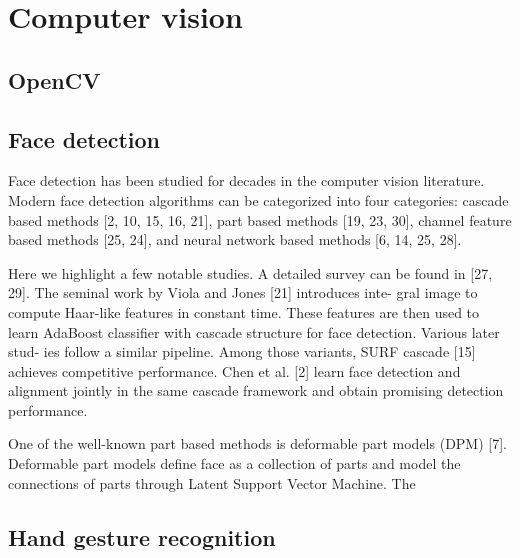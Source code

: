 %
\section{Computer vision}
\label{sec:computer-vision}

\subsection{OpenCV}
\label{sec:opencv}

\subsection{Face detection}
\label{sec:face-detection}
Face detection has been studied for decades in the computer
vision literature. Modern face detection algorithms can
be categorized into four categories:
cascade based methods [2, 10, 15, 16, 21],
part based methods [19, 23, 30], channel feature based methods [25, 24], and
neural network based methods [6, 14, 25, 28].

Here we highlight a few notable studies.
A detailed survey can be found in [27, 29].
The seminal work by Viola and Jones [21] introduces inte-
gral image to compute Haar-like features in constant time.
These features are then used to learn AdaBoost classifier
with cascade structure for face detection. Various later stud-
ies follow a similar pipeline. Among those variants, SURF
cascade [15] achieves competitive performance. Chen et al. [2] learn face
detection and alignment jointly in the same cascade framework and obtain promising detection performance.

One of the well-known part based methods is deformable
part models (DPM) [7]. Deformable part models define
face as a collection of parts and model the connections
of parts through Latent Support Vector Machine. The

\subsection{Hand gesture recognition}
\label{sec:hand-gest-recogn}


